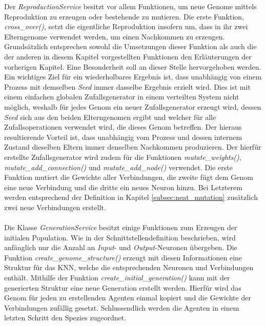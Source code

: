 Der \emph{ReproductionService} besitzt vor allem Funktionen, um neue Genome mittels Reproduktion zu erzeugen oder bestehende zu mutieren. Die erste Funktion, \emph{cross\_over()}, setzt die eigentliche Reproduktion insofern um, dass in ihr zwei Elterngenome verwendet werden, um einen Nachkommen zu erzeugen. Grundsätzlich entsprechen sowohl die Umsetzungen dieser Funktion als auch die der anderen in diesem Kapitel vorgestellten Funktionen den Erläuterungen der vorherigen Kapitel. Eine Besonderheit soll an dieser Stelle hervorgehoben werden. Ein wichtiges Ziel für ein wiederholbares Ergebnis ist, dass unabhängig von einem Prozess mit demselben \emph{Seed} immer dasselbe Ergebnis erzielt wird. Dies ist mit einem einfachen globalen Zufallsgenerator in einem verteilten System nicht möglich, weshalb für jedes Genom ein neuer Zufallsgenerator erzeugt wird, dessen \emph{Seed} sich aus den beiden Elterngenomen ergibt und welcher für alle Zufallsoperationen verwendet wird, die dieses Genom betreffen. Der hieraus resultierende Vorteil ist, dass unabhängig vom Prozess und dessen internem Zustand dieselben Eltern immer denselben Nachkommen produzieren. Der hierfür erstellte Zufallsgenerator wird zudem für die Funktionen \emph{mutate\_weights()}, \emph{mutate\_add\_connection()} und \emph{mutate\_add\_node()} verwendet. Die erste Funktion mutiert die Gewichte aller Verbindungen, die zweite fügt dem Genom eine neue Verbindung und die dritte ein neues Neuron hinzu. Bei Letzterem werden entsprechend der Definition in Kapitel \ref{subsec:neat_mutation} zusätzlich zwei neue Verbindungen erstellt.
\\\\
Die Klasse \emph{GenerationService} besitzt einige Funktionen zum Erzeugen der initialen Population. Wie in der Schnittstellendefinition beschrieben, wird anfänglich nur die Anzahl an \emph{Input}- und \emph{Output}-Neuronen übergeben. Die Funktion \emph{create\_genome\_structure()} erzeugt mit diesen Informationen eine Struktur für das \ac{KNN}, welche die entsprechenden Neuronen und Verbindungen enthält. Mithilfe der Funktion \emph{create\_initial\_generation()} kann mit der generierten Struktur eine neue Generation erstellt werden. Hierfür wird das Genom für jeden zu erstellenden Agenten einmal kopiert und die Gewichte der Verbindungen zufällig gesetzt. Schlussendlich werden die Agenten in einem letzten Schritt den Spezies zugeordnet.
\\\\
